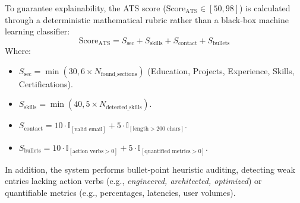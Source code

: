 \documentclass[12pt,a4paper,oneside]{report}
\begin{document}
To guarantee explainability, the ATS score ($\text{Score}_{\text{ATS}} \in [50, 98]$) is calculated through a deterministic mathematical rubric rather than a black-box machine learning classifier:
\begin{equation}
    \text{Score}_{\text{ATS}} = S_{\text{sec}} + S_{\text{skills}} + S_{\text{contact}} + S_{\text{bullets}}
\end{equation}
Where:
\begin{itemize}[leftmargin=0.8cm]
    \item $S_{\text{sec}} = \min(30, 6 \times N_{\text{found\_sections}})$ (Education, Projects, Experience, Skills, Certifications).
    \item $S_{\text{skills}} = \min(40, 5 \times N_{\text{detected\_skills}})$.
    \item $S_{\text{contact}} = 10 \cdot \mathbb{I}_{[\text{valid email}]} + 5 \cdot \mathbb{I}_{[\text{length} > 200 \text{ chars}]}$.
    \item $S_{\text{bullets}} = 10 \cdot \mathbb{I}_{[\text{action verbs} > 0]} + 5 \cdot \mathbb{I}_{[\text{quantified metrics} > 0]}$.
\end{itemize}
In addition, the system performs bullet-point heuristic auditing, detecting weak entries lacking action verbs (e.g., \textit{engineered, architected, optimized}) or quantifiable metrics (e.g., percentages, latencies, user volumes).
\end{document}
